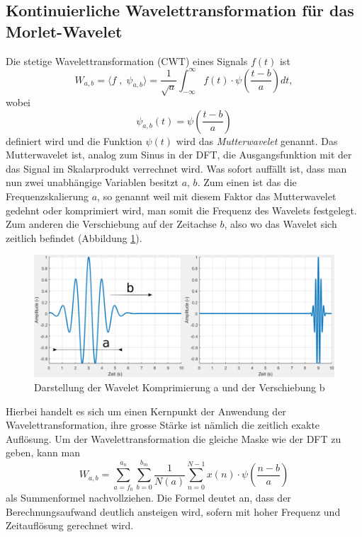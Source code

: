 \subsection{Kontinuierliche Wavelettransformation für das Morlet-Wavelet
	\label{wavelets:subsection:CWT}}
Die stetige Wavelettransformation (CWT) eines Signals $f(t)$ ist
\cite{wavelets:H.Burkhardt.2020}
\begin{equation}
	W_{a,b}=\langle f \; , \; \psi_{a,b} \rangle = \frac{1}{\sqrt{a}}\int_{-\infty}^{\infty} f(t)\cdot\psi\left(\frac{t-b}{a}\right) dt,
	\label{wavelets:equation3}
\end{equation}
wobei
\[
\psi_{a,b}(t)=\psi\left(\frac{t-b}{a}\right)
\]
definiert wird und die Funktion $\psi(t)$ wird das {\em Mutterwavelet}
genannt. Das Mutterwavelet ist, analog zum Sinus in der DFT, die
Ausgangsfunktion mit der das Signal im Skalarprodukt verrechnet
wird.
Was sofort auffällt ist, dass man nun zwei unabhängige Variablen
besitzt $a$, $b$.
Zum einen ist das die Frequenzskalierung $a$, so
genannt weil mit diesem Faktor das Mutterwavelet gedehnt oder
komprimiert wird, man somit die Frequenz des Wavelets festgelegt.
Zum anderen die Verschiebung auf der Zeitachse $b$, also wo das
Wavelet sich zeitlich befindet (Abbildung
\ref{wavelet:fig:5_WaveletKompUndShift}).

\begin{figure}
	\centering
	\includegraphics[width=\textwidth]{papers/wavelets/images/5_WaveletKompUndShift.png}
	\caption{Darstellung der Wavelet Komprimierung a und der Verschiebung b}
	\label{wavelet:fig:5_WaveletKompUndShift}
\end{figure}%

Hierbei handelt es sich um einen Kernpunkt der Anwendung der
Wavelettransformation, ihre grosse Stärke ist nämlich die zeitlich
exakte Auflösung. Um der Wavelettransformation die gleiche Maske
wie der DFT zu geben, kann man
\begin{equation}
	W_{a,b}=\sum_{a=f_0}^{a_n}\sum_{b=0}^{b_m}\frac{1}{N(a)}\sum_{n=0}^{N-1} x(n)\cdot\psi\left(\frac{n-b}{a}\right)
	\label{wavelets:equation4}
\end{equation}
als Summenformel nachvollziehen.
Die Formel deutet an, dass der Berechnungsaufwand deutlich ansteigen wird,
sofern mit hoher Frequenz und Zeitauflösung gerechnet wird.

